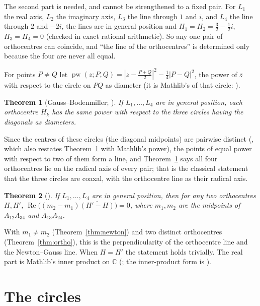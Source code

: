 \documentclass[11pt]{article}
\newtheorem{theorem}{Theorem}
\theoremstyle{definition}
\theoremstyle{remark}
\newcommand{\CC}{\mathbb{C}}
\begin{document}
The second part is needed, and cannot be strengthened to a fixed pair. For $L_1$ the real axis, $L_2$
the imaginary axis, $L_3$ the line through $1$ and $i$, and $L_4$ the line through $2$ and $-2i$, the
lines are in general position and $H_1=H_2=\tfrac32-\tfrac12i$, $H_3=H_4=0$ (checked in exact rational
arithmetic). So any one pair of orthocentres can coincide, and ``the line of the orthocentres'' is
determined only because the four are never all equal.

For points $P\neq Q$ let $\operatorname{pw}(z;P,Q)=|z-\tfrac{P+Q}2|^2-\tfrac14|P-Q|^2$, the power of $z$
with respect to the circle on $PQ$ as diameter (it is Mathlib's 
of that circle: ).

\begin{theorem}[Gauss--Bodenmiller; ]\label{thm:boden}
If $L_1,\dots,L_4$ are in general position, each orthocentre $H_k$ has the same power with respect to
the three circles having the diagonals as diameters.
\end{theorem}

Since the centres of these circles (the diagonal midpoints) are pairwise distinct
(, which also restates Theorem~\ref{thm:boden} with Mathlib's
power), the points of equal power with respect to two of them form a line, and Theorem~\ref{thm:boden} says all four orthocentres
lie on the radical axis of every pair; that is the classical statement that the three circles are
coaxal, with the orthocentre line as their radical axis.

\begin{theorem}[]\label{thm:perp}
If $L_1,\dots,L_4$ are in general position, then for any two orthocentres $H,H'$,
$\operatorname{Re}\big((m_2-m_1)\overline{(H'-H)}\big)=0$, where $m_1,m_2$ are the midpoints of
$A_{12}A_{34}$ and $A_{13}A_{24}$.
\end{theorem}
With $m_1\neq m_2$ (Theorem~\ref{thm:newton}) and two distinct orthocentres (Theorem~\ref{thm:ortho}),
this is the perpendicularity of the orthocentre line and the Newton--Gauss line. When $H=H'$ the
statement holds trivially. The real part is Mathlib's inner product on $\CC$
(; the inner-product form is ).

\section{The circles}\label{sec:circ}
\end{document}
